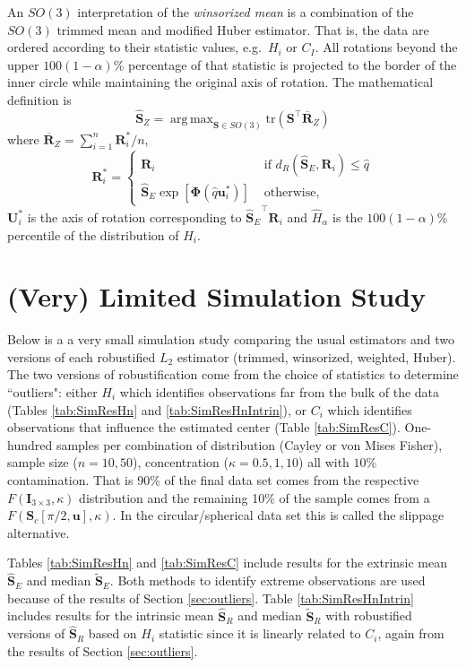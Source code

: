 \documentclass{article}\usepackage[]{graphicx}\usepackage[]{color}
\DeclareMathOperator*{\argmax}{arg\,max}
\newcommand{\ProjMean}{{\widehat{\bm S}_{E}}}
\newcommand{\ProjMedian}{{\widetilde{\bm S}_{E}}}
\newcommand{\GeomMean}{{\widehat{\bm S}_{R}}}
\newcommand{\GeomMedian}{{\widetilde{\bm S}_{R}}}
\newcommand{\WinzMean}{{\widehat{\bm S}_Z}}
\begin{document}
An $SO(3)$ interpretation of the \emph{winsorized mean} is a combination of the $SO(3)$ trimmed mean and modified Huber estimator.  That is, the data are ordered according to their statistic values, e.g.~$H_i$ or $C_I$.  All rotations beyond the upper $100(1-\alpha)$\% percentage of that statistic is projected to the border of the inner circle while maintaining the original axis of rotation.  The mathematical definition is 
\[
\WinzMean=\argmax_{\bm S\in SO(3)}\text{tr}(\bm S^\top\overline{\bm R}_{Z})
\]
where $\overline{\bm R}_{Z}=\sum_{i=1}^n\bm R_i^*/n$, 
\[
\bm R_i^*=
\begin{cases}
\bm R_i&\text{ if }d_R(\ProjMean,\bm R_i)\leq\hat{q}\\
\ProjMean\exp[\bm{\Phi}(\hat{q}\bm{u}_i^*)]&\text{ otherwise,}
\end{cases}
\]
$\bm U_i^*$ is the axis of rotation corresponding to $\ProjMean^\top\bm R_i$ and $\hat{H}_\alpha$ is the $100(1-\alpha)$\% percentile of the distribution of $H_i$.




\section{(Very) Limited Simulation Study}

Below is a a very small simulation study comparing the usual estimators and two versions of each robustified $L_2$ estimator (trimmed, winsorized, weighted, Huber).  The two versions of robustification come from the choice of statistics to determine ``outliers": either $H_i$ which identifies observations far from the bulk of the data (Tables \ref{tab:SimResHn} and \ref{tab:SimResHnIntrin}), or $C_i$ which identifies observations that influence the estimated center (Table \ref{tab:SimResC}).  One-hundred samples per combination of distribution (Cayley or von Mises Fisher), sample size ($n=10,50$), concentration ($\kappa=0.5,1,10$) all with $10\%$ contamination.  That is 90\% of the final data set comes from the respective $F(\bm I_{3\times 3},\kappa)$ distribution and the remaining 10\% of the sample comes from a $F(\bm S_c[\pi/2,\bm u],\kappa)$.  In the circular/spherical data set this is called the slippage alternative.  

Tables \ref{tab:SimResHn} and \ref{tab:SimResC} include results for the extrinsic mean $\ProjMean$ and median $\ProjMedian$. Both methods to identify extreme observations are used because of the results of Section \ref{sec:outliers}.  Table \ref{tab:SimResHnIntrin} includes results for the intrinsic mean $\GeomMean$ and median $\GeomMedian$ with robustified versions of $\GeomMean$ based on $H_i$ statistic since it is linearly related to $C_i$, again from the results of Section \ref{sec:outliers}.
\end{document}
